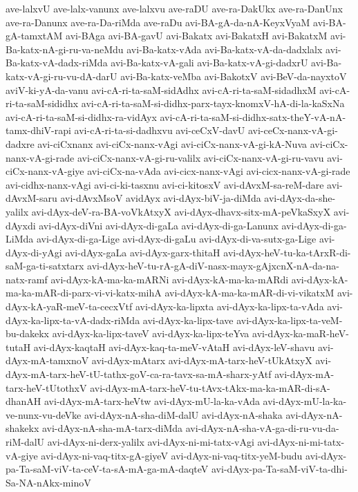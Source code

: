 {ave-lalxvU
ave-lalx-vanunx
ave-lalxvu
ave-raDU
ave-ra-DakUkx
ave-ra-DanUnx
ave-ra-Danunx
ave-ra-Da-riMda
ave-raDu
avi-BA-gA-da-nA-KeyxVyaM
avi-BA-gA-tamxtAM
avi-BAga
avi-BA-gavU
avi-Bakatx
avi-BakatxH
avi-BakatxM
avi-Ba-katx-nA-gi-ru-va-neMdu
avi-Ba-katx-vAda
avi-Ba-katx-vA-da-dadxlalx
avi-Ba-katx-vA-dadx-riMda
avi-Ba-katx-vA-gali
avi-Ba-katx-vA-gi-dadxrU
avi-Ba-katx-vA-gi-ru-vu-dA-darU
avi-Ba-katx-veMba
avi-BakotxV
avi-BeV-da-nayxtoV
aviV-ki-yA-da-vanu
avi-cA-ri-ta-saM-sidAdhx
avi-cA-ri-ta-saM-sidadhxM
avi-cA-ri-ta-saM-sididhx
avi-cA-ri-ta-saM-si-didhx-parx-tayx-knomxV-hA-di-la-kaSxNa
avi-cA-ri-ta-saM-si-didhx-ra-vidAyx
avi-cA-ri-ta-saM-si-didhx-satx-theY-vA-nA-tamx-dhiV-rapi
avi-cA-ri-ta-si-dadhxvu
avi-ceCxV-davU
avi-ceCx-nanx-vA-gi-dadxre
avi-ciCxnanx
avi-ciCx-nanx-vAgi
avi-ciCx-nanx-vA-gi-kA-Nuva
avi-ciCx-nanx-vA-gi-rade
avi-ciCx-nanx-vA-gi-ru-valilx
avi-ciCx-nanx-vA-gi-ru-vavu
avi-ciCx-nanx-vA-giye
avi-ciCx-na-vAda
avi-cicx-nanx-vAgi
avi-cicx-nanx-vA-gi-rade
avi-cidhx-nanx-vAgi
avi-ci-ki-tasxnu
avi-ci-kitosxV
avi-dAvxM-sa-reM-dare
avi-dAvxM-saru
avi-dAvxMsoV
avidAyx
avi-dAyx-biV-ja-diMda
avi-dAyx-da-she-yalilx
avi-dAyx-deV-ra-BA-voVkAtxyX
avi-dAyx-dhavx-sitx-mA-peVkaSxyX
avi-dAyxdi
avi-dAyx-diVni
avi-dAyx-di-gaLa
avi-dAyx-di-ga-Lanunx
avi-dAyx-di-ga-LiMda
avi-dAyx-di-ga-Lige
avi-dAyx-di-gaLu
avi-dAyx-di-va-sutx-ga-Lige
avi-dAyx-di-yAgi
avi-dAyx-gaLa
avi-dAyx-garx-thitaH
avi-dAyx-heV-tu-ka-tArxR-di-saM-ga-ti-satxtarx
avi-dAyx-heV-tu-rA-gA-diV-nasx-mayx-gAjxcnX-nA-da-na-natx-ramf
avi-dAyx-kA-ma-ka-mARNi
avi-dAyx-kA-ma-ka-mARdi
avi-dAyx-kA-ma-ka-mAR-di-parx-vi-vi-katx-mihA
avi-dAyx-kA-ma-ka-mAR-di-vi-vikatxM
avi-dAyx-kA-yaR-meV-ta-cecxVtf
avi-dAyx-ka-lipxta
avi-dAyx-ka-lipx-ta-vAda
avi-dAyx-ka-lipx-ta-vA-dadx-riMda
avi-dAyx-ka-lipx-tave
avi-dAyx-ka-lipx-ta-veM-bu-dakekx
avi-dAyx-ka-lipx-taveV
avi-dAyx-ka-lipx-teYva
avi-dAyx-ka-maR-heV-tutaH
avi-dAyx-kaqtaH
avi-dAyx-kaq-ta-meV-vAtaH
avi-dAyx-leV-shavu
avi-dAyx-mA-tamxnoV
avi-dAyx-mAtarx
avi-dAyx-mA-tarx-heV-tUkAtxyX
avi-dAyx-mA-tarx-heV-tU-tathx-goV-ca-ra-tavx-sa-mA-sharx-yAtf
avi-dAyx-mA-tarx-heV-tUtothxV
avi-dAyx-mA-tarx-heV-tu-tAvx-tAkx-ma-ka-mAR-di-sA-dhanAH
avi-dAyx-mA-tarx-heVtw
avi-dAyx-mU-la-ka-vAda
avi-dAyx-mU-la-ka-ve-nunx-vu-deVke
avi-dAyx-nA-sha-diM-dalU
avi-dAyx-nA-shaka
avi-dAyx-nA-shakekx
avi-dAyx-nA-sha-mA-tarx-diMda
avi-dAyx-nA-sha-vA-ga-di-ru-vu-da-riM-dalU
avi-dAyx-ni-derx-yalilx
avi-dAyx-ni-mi-tatx-vAgi
avi-dAyx-ni-mi-tatx-vA-giye
avi-dAyx-ni-vaq-titx-gA-giyeV
avi-dAyx-ni-vaq-titx-yeM-budu
avi-dAyx-pa-Ta-saM-viV-ta-ceV-ta-sA-mA-ga-mA-daqteV
avi-dAyx-pa-Ta-saM-viV-ta-dhi-Sa-NA-nAkx-minoV
}
